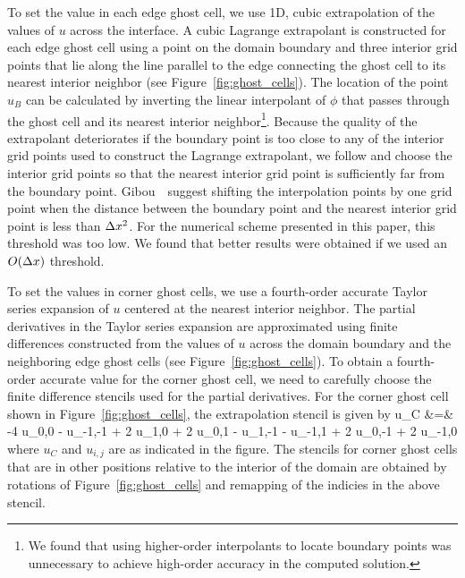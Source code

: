 \documentclass[oneeqnum,onefignum,onetabnum,onethmnum]{siamltex}
\begin{document}
To set the value in each edge ghost cell, we use 1D, cubic extrapolation of 
the values of $u$ across the interface.  A cubic Lagrange extrapolant is 
constructed for each edge ghost cell using a point on the domain boundary 
and three interior grid points that lie along the line parallel to the edge 
connecting the ghost cell to its nearest interior neighbor (see 
Figure~\ref{fig:ghost_cells}).  
The location of the point $u_B$ can be calculated by inverting the linear 
interpolant of $\phi$ that passes through the ghost cell and its nearest
interior neighbor\footnote{We found that using higher-order interpolants to 
locate boundary points was unnecessary to achieve high-order accuracy in the
computed solution.}.
Because the quality of the extrapolant deteriorates if the boundary point is 
too close to any of the interior grid 
points used to construct the Lagrange extrapolant, we follow 
\cite{gibou_2005} and choose the interior grid points so that the nearest
interior grid point is sufficiently far from the boundary point.  
Gibou~\etal~suggest shifting the interpolation points by one grid point 
when the distance between the boundary point and the nearest interior grid 
point is less than $\Delta x^2$.  For the numerical scheme presented in this paper, 
this threshold was too low.  We found that better results were obtained if 
we used an $O(\Delta x)$ threshold.

To set the values in corner ghost cells, we use a fourth-order accurate
Taylor series expansion of $u$ centered at the nearest interior 
neighbor.  The partial derivatives in the Taylor series expansion are 
approximated using finite differences constructed from the values of $u$ 
across the domain boundary and the neighboring edge ghost cells (see 
Figure~\ref{fig:ghost_cells}).  To obtain a fourth-order accurate value for 
the corner ghost cell, we need to carefully choose the finite difference 
stencils used for the partial derivatives.  For the corner ghost cell shown 
in Figure~\ref{fig:ghost_cells}, the extrapolation stencil is given by
\bea
  u_C &=&  -4 u_{0,0} - u_{-1,-1} + 2 u_{1,0} + 2 u_{0,1}
      - u_{1,-1} - u_{-1,1} + 2 u_{0,-1} + 2 u_{-1,0}
\eea
where $u_C$ and $u_{i,j}$ are as indicated in the figure.  The stencils for
corner ghost cells that are in other positions relative to the interior of 
the domain are obtained by rotations of Figure~\ref{fig:ghost_cells} and 
remapping of the indicies in the above stencil.
\end{document}
